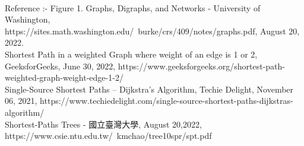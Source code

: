 \documentclass{article}
\begin{document}
\begin{enumerate}
\\Reference :- Figure 1. Graphs, Digraphs, and Networks - University of Washington, https://sites.math.washington.edu/~burke/crs/409/notes/graphs.pdf, August 20, 2022.\\
Shortest Path in a weighted Graph where weight of an edge is 1 or 2, GeeksforGeeks, June 30, 2022, https://www.geeksforgeeks.org/shortest-path-weighted-graph-weight-edge-1-2/\\
Single-Source Shortest Paths – Dijkstra's Algorithm, Techie Delight, November 06, 2021, https://www.techiedelight.com/single-source-shortest-paths-dijkstras-algorithm/\\
Shortest-Paths Trees - 國立臺灣大學, August 20,2022, https://www.csie.ntu.edu.tw/~kmchao/tree10spr/spt.pdf\\

\end{enumerate}
\end{document}
